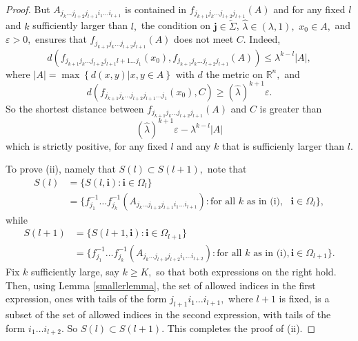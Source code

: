 \documentclass{amsproc}%
\theoremstyle{plain}
\theoremstyle{definition}
\numberwithin{equation}{section}
\begin{document}
\begin{proof}
But $A_{j_{k}\dots j_{l+2}j_{l+1}i_{1}\dots i_{l+1}}$ is contained in
$f_{j_{k+1}j_{k}\dots j_{l+2}j_{l+1}}(A)$ and for any fixed $l$ and $k$
sufficiently larger than $l,$ the condition on $\mathbf{j\in}%
\overleftarrow{\Sigma}$, $\widehat{\lambda}\in(\lambda,1),$ $x_{0}\in A,$ and
$\varepsilon>0,$ ensures that $f_{j_{k+1}j_{k}\dots j_{l+2}j_{l+1}}(A)$ does
not meet $C.$ Indeed,%
\begin{equation}
d(f_{j_{k+1}j_{k}\dots j_{l+2}j_{l+1}l+1\dots j_{1}}(x_{0}),f_{j_{k+1}%
j_{k}\dots j_{l+2}j_{l+1}}(A))\leq\lambda^{k-l}|A|, \label{estimate1}%
\end{equation}
where $\left\vert A\right\vert =\max\left\{  d(x,y)|x,y\in A\right\}  $ with
$d$ the metric on $\mathbb{R}^{n},$ and%
\begin{equation}
d(f_{j_{k+1}j_{k}\dots j_{l+2}j_{l+1}\dots j_{1}}(x_{0}),C)\geq\left(
\widehat{\lambda}\right)  ^{k+1}\varepsilon. \label{estimate2}%
\end{equation}
So the shortest distance between $f_{j_{k+1}j_{k}\dots j_{l+2}j_{l+1}}(A)$ and
$C$ is greater than
\begin{equation}
\left(  \widehat{\lambda}\right)  ^{k+1}\varepsilon-\lambda^{k-l}|A|
\label{ineq}%
\end{equation}
which is strictly positive, for any fixed $l$ and any $k$ that is sufficienly
larger than $l.$

To prove (ii), namely that $S(l)\subset S(l+1),$ note that
\begin{align*}
S(l)  &  =\{S(l,\mathbf{i}):\mathbf{i}\in\Omega_{l}\}\\
&  =\{f_{j_{1}}^{-1}\dots f_{j_{k}}^{-1}(A_{j_{k}\dots j_{l+2}j_{l+1}%
i_{1}\dots i_{l+1}}):\text{for all }k\text{ as in (i)},\text{ }\mathbf{i}%
\in\Omega_{l}\},
\end{align*}
while
\begin{align*}
S(l+1)  &  =\{S(l+1,\mathbf{i}):\mathbf{i}\in\Omega_{l+1}\}\\
&  =\{f_{j_{1}}^{-1}\dots f_{j_{k}}^{-1}(A_{j_{k}\dots j_{l+3}j_{l+2}%
i_{1}\dots i_{l+2}}):\text{for all }k\text{ as in (i)},\mathbf{i}\in
\Omega_{l+1}\}.
\end{align*}
Fix $k$ sufficiently large, say $k\geq K,$ so that both expressions on the
right hold. Then, using Lemma \ref{smallerlemma}, the set of allowed indices
in the first expression, ones with tails of the form $j_{l+1}i_{1}\dots
i_{l+1},$ where $l+1$ is fixed, is a subset of the set of allowed indices in
the second expression, with tails of the form $i_{1}\dots i_{l+2}$. So
$S(l)\subset S(l+1)$. This completes the proof of (ii).


\end{proof}
\end{document}
